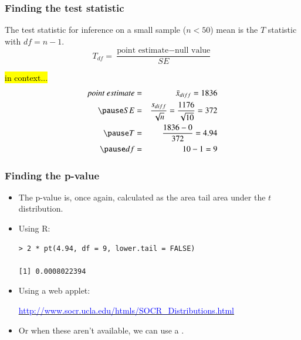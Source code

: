 \begin{frame}
\frametitle{Finding the test statistic}

{The test statistic for inference on a small sample ($n < 50$) mean is the $T$ statistic with $df = n - 1$.
\[ T_{df} = \frac{\text{point estimate} - \text{null value}}{SE} \]}

\pause

\vspace{-0.5cm}

\hl{in context...}
\begin{eqnarray*}
point~estimate &=& \bar{x}_{diff} = 1836 \\
\pause
SE &=& \frac{s_{diff}}{\sqrt{n}} = \frac{1176}{\sqrt{10}} = 372 \\
\pause
T &=& \frac{1836 - 0}{372} = 4.94 \\
\pause
df &=& 10 - 1 = 9
\end{eqnarray*}


\end{frame}


\begin{frame}[fragile]
\frametitle{Finding the p-value}

\begin{itemize}

\item The p-value is, once again, calculated as the area tail area under the $t$ distribution.

\pause

\item Using R:
\begin{verbatim}
> 2 * pt(4.94, df = 9, lower.tail = FALSE)

[1] 0.0008022394
\end{verbatim}

\pause

\item Using a web applet:

\href{http://www.socr.ucla.edu/htmls/SOCR\_Distributions.html}{\textcolor{blue}{http://www.socr.ucla.edu/htmls/SOCR\_Distributions.html}}

\pause

\item Or when these aren't available, we can use a .

\end{itemize}

\end{frame}

